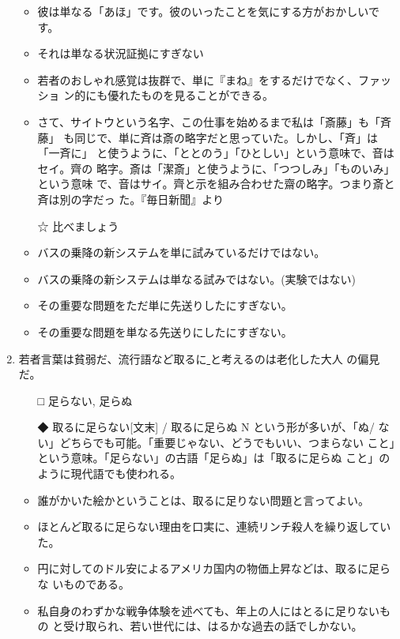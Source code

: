 \documentclass[
uplatex,
b5paper,
10pt,
dvipdfmx
]{jsbook}
\begin{document}
\begin{enumerate}
\begin{itemize}
\item 彼は単なる「あほ」です。彼のいったことを気にする方がおかしいです。
\item それは単なる状況証拠にすぎない
\item 若者のおしゃれ感覚は抜群で、単に『まね』をするだけでなく、ファッショ
      ン的にも優れたものを見ることができる。
\item さて、サイトウという名字、この仕事を始めるまで私は「斎藤」も「斉藤」
      も同じで、単に斉は斎の略字だと思っていた。しかし、「斉」は「一斉に」
      と使うように、「ととのう」「ひとしい」という意味で、音はセイ。齊の
      略字。斎は「潔斎」と使うように、「つつしみ」「ものいみ」という意味
      で、音はサイ。齊と示を組み合わせた齋の略字。つまり斎と斉は別の字だっ
      た。『毎日新聞』より
\end{itemize}

\begin{itemize}
\item[☆] 比べましょう
\end{itemize}

\begin{itemize}
\item バスの乗降の新システムを単に試みているだけではない。
\item バスの乗降の新システムは単なる試みではない。(実験ではない)
\item その重要な問題をただ単に先送りしたにすぎない。
\item その重要な問題を単なる先送りにしたにすぎない。
\end{itemize}


\item 若者言葉は貧弱だ、流行語など取るに\underline{   }と考えるのは老化した大人
      の偏見だ。

\begin{itemize}
\item[□] 足らない, 足らぬ
\item[◆] 取るに足らない[文末] / 取るに足らぬ N という形が多いが、「ぬ/
	  ない」どちらでも可能。「重要じゃない、どうでもいい、つまらない
	  こと」という意味。「足らない」の古語「足らぬ」は「取るに足らぬ
	  こと」のように現代語でも使われる。
\end{itemize}

\begin{itemize}
\item 誰がかいた絵かということは、取るに足りない問題と言ってよい。
\item ほとんど取るに足らない理由を口実に、連続リンチ殺人を繰り返していた。
\item 円に対してのドル安によるアメリカ国内の物価上昇などは、取るに足らな
      いものである。
\item 私自身のわずかな戦争体験を述べても、年上の人にはとるに足りないもの
      と受け取られ、若い世代には、はるかな過去の話でしかない。
\end{itemize}



\end{enumerate}
\end{document}
